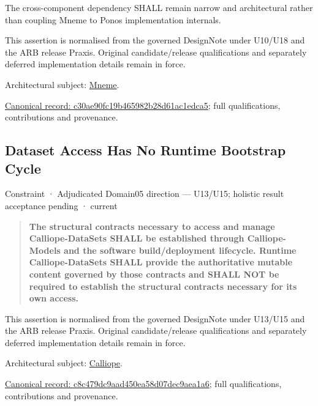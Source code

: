 The cross-component dependency SHALL remain narrow and architectural rather than coupling Mneme to Ponos implementation internals.



This assertion is normalised from the governed DesignNote under U10/U18 and the ARB release Praxis. Original candidate/release qualifications and separately deferred implementation details remain in force.



Architectural subject: \hyperref[element:1af8a56358f7429fabfb57be66542a99]{Mneme}.


{\footnotesize \href{../../../../continuum/motivation/constraint/c30ae90fc19b465982b28d61ac1edca5.md}{Canonical record: c30ae90fc19b465982b28d61ac1edca5}; full qualifications, contributions and provenance.}\par
\subsection{Dataset Access Has No Runtime Bootstrap Cycle}

\label{element:c8c479dc9aad450ea58d07dec9aea1a6}
{\small Constraint · Adjudicated Domain05 direction — U13/U15; holistic result acceptance pending · current}\par

\begin{quote}


\textbf{The structural contracts necessary to access and manage
Calliope-DataSets SHALL be established through Calliope-Models and the
software build/deployment lifecycle. Runtime Calliope-DataSets SHALL
provide the authoritative mutable content governed by those contracts
and SHALL NOT be required to establish the structural contracts
necessary for its own access.}



\end{quote}


This assertion is normalised from the governed DesignNote under U13/U15 and the ARB release Praxis. Original candidate/release qualifications and separately deferred implementation details remain in force.



Architectural subject: \hyperref[element:466ad8f75a954c0581b5bba090443849]{Calliope}.


{\footnotesize \href{../../../../continuum/motivation/constraint/c8c479dc9aad450ea58d07dec9aea1a6.md}{Canonical record: c8c479dc9aad450ea58d07dec9aea1a6}; full qualifications, contributions and provenance.}\par
